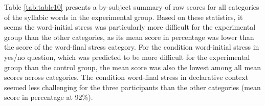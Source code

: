 \documentclass[a4paper]{article}
\begin{document}
%
%

Table \ref{tab:table10} presents a by-subject summary of raw scores for all categories of the syllabic words in the experimental group. Based on these statistics, it seems the word-initial stress was particularly more difficult for the experimental group than the other categories, as its mean score in percentage was lower than the score of the word-final stress category. For the condition word-initial stress in yes/no question, which was predicted to be more difficult for the experimental group than the control group, the mean score was also the lowest among all mean scores across categories. The condition word-final stress in declarative context seemed less challenging for the three participants than the other categories (mean score in percentage at 92\%).
\end{document}
